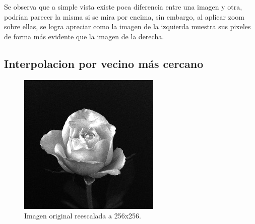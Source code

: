 \documentclass[11pt, letterpaper]{article}
\begin{document}
	Se observa que a simple vista existe poca diferencia entre una imagen y otra, podrían parecer la misma si se mira por encima, sin embargo, al aplicar zoom sobre ellas, se logra apreciar como la imagen de la izquierda muestra sus pixeles de forma más evidente que la imagen de la derecha.
	
	\newpage
	
	
	\subsection{Interpolacion por vecino más cercano}
	
	\begin{figure}[h]
		\centering
		\begin{minipage}{0.45\textwidth}
			\centering
			\includegraphics[width=\textwidth]{IMG/v1.jpg}
			\caption{Imagen original reescalada a 256x256.}
			\label{fig:b1}
		\end{minipage}
		\hfill
		\begin{minipage}{0.45\textwidth}
			\centering

\end{minipage}
\end{figure}
\end{document}
